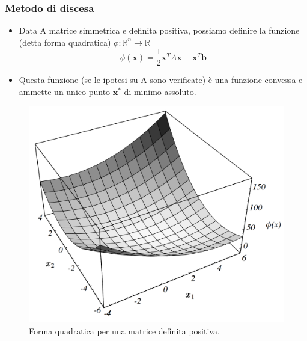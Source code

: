 \documentclass[10pt]{beamer}
\begin{document}


\begin{frame} \frametitle{Metodo di discesa}
\begin{itemize}
    \item Data A matrice simmetrica e definita positiva, possiamo definire la funzione (detta \alert{forma quadratica}) $\phi:\mathbb{R}^n \to \mathbb{R}$ $$\phi(\mathbf{x})=\frac{1}{2}\mathbf{x}^TA\mathbf{x}-\mathbf{x}^T\mathbf{b}$$
    \item Questa funzione (se le ipotesi su A sono verificate) è una funzione convessa e ammette un unico punto $\mathbf{x}^{\ast}$ di \alert{minimo assoluto}.
    
\end{itemize}
\begin{figure}
    \centering
    \includegraphics[width=.25\linewidth]{cg_quad.png}
    \caption{Forma quadratica per una matrice definita positiva.}
    \label{fig:quad}
\end{figure}
\end{frame}
\end{document}

